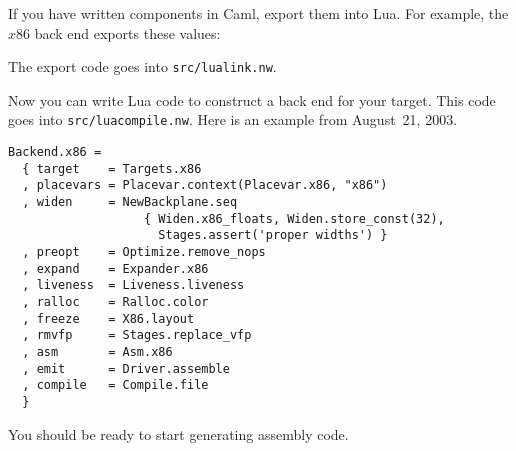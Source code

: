 \documentclass[12pt]{article}
\begin{document}
If you have written components in Caml, export them into Lua.
For example, the $x$86 back end exports these values:\\
The export code goes into \texttt{src/lualink.nw}.

Now you can write Lua code to construct a back end for your target.
This code goes into \texttt{src/luacompile.nw}.
Here is an example from August~21, 2003.
\begin{verbatim}
Backend.x86 =     
  { target    = Targets.x86
  , placevars = Placevar.context(Placevar.x86, "x86")
  , widen     = NewBackplane.seq
                   { Widen.x86_floats, Widen.store_const(32),
                     Stages.assert('proper widths') }
  , preopt    = Optimize.remove_nops
  , expand    = Expander.x86
  , liveness  = Liveness.liveness
  , ralloc    = Ralloc.color
  , freeze    = X86.layout
  , rmvfp     = Stages.replace_vfp
  , asm       = Asm.x86
  , emit      = Driver.assemble
  , compile   = Compile.file
  }   
\end{verbatim}
You should be ready to start generating assembly code.
\end{document}
